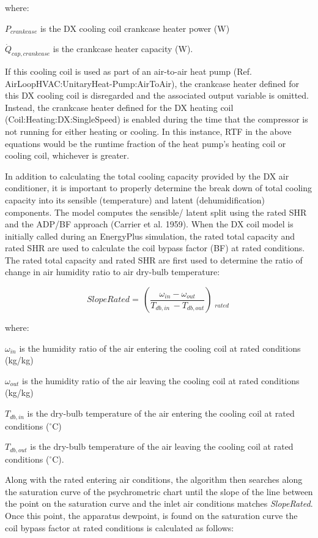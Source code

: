 where:

\({P_{crankcase}}\) is the DX cooling coil crankcase heater power (W)

\(\dot{Q}_{cap,crankcase}\) is the crankcase heater capacity (W).

If this cooling coil is used as part of an air-to-air heat pump (Ref. AirLoopHVAC:UnitaryHeat-Pump:AirToAir), the crankcase heater defined for this DX cooling coil is disregarded and the associated output variable is omitted. Instead, the crankcase heater defined for the DX heating coil (Coil:Heating:DX:SingleSpeed) is enabled during the time that the compressor is not running for either heating or cooling. In this instance, RTF in the above equations would be the runtime fraction of the heat pump's heating coil or cooling coil, whichever is greater.

In addition to calculating the total cooling capacity provided by the DX air conditioner, it is important to properly determine the break down of total cooling capacity into its sensible (temperature) and latent (dehumidification) components. The model computes the sensible/ latent split using the rated SHR and the ADP/BF approach (Carrier et al. 1959). When the DX coil model is initially called during an EnergyPlus simulation, the rated total capacity and rated SHR are used to calculate the coil bypass factor (BF) at rated conditions. The rated total capacity and rated SHR are first used to determine the ratio of change in air humidity ratio to air dry-bulb temperature:

\begin{equation}
SlopeRated = \,\left( {\frac{{{\omega_{in}} - {\omega_{out}}}}{{{T_{db,in}}\, - {T_{db,out}}}}} \right)\mathop {}\limits_{rated}
\end{equation}

where:

\(\omega_{in}\) is the humidity ratio of the air entering the cooling coil at rated conditions (kg/kg)

\(\omega_{out}\) is the humidity ratio of the air leaving the cooling coil at rated conditions (kg/kg)

\(T_{db,in}\) is the dry-bulb temperature of the air entering the cooling coil at rated conditions (\(^{\circ}\)C)

\(T_{db,out}\) is the dry-bulb temperature of the air leaving the cooling coil at rated conditions (\(^{\circ}\)C).

Along with the rated entering air conditions, the algorithm then searches along the saturation curve of the psychrometric chart until the slope of the line between the point on the saturation curve and the inlet air conditions matches \emph{SlopeRated}. Once this point, the apparatus dewpoint, is found on the saturation curve the coil bypass factor at rated conditions is calculated as follows:

